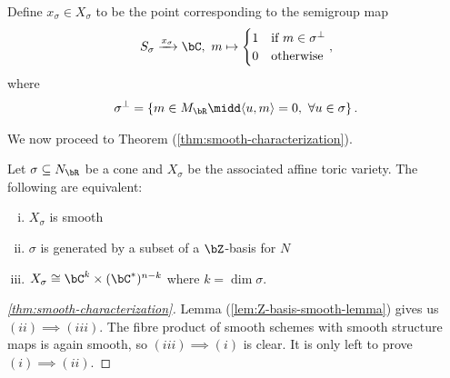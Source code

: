 \begin{defn}\label{defn:perp-cone-distinguished-semigroup-hom}
	Define $x_\sigma \in X_\sigma$ to be the point corresponding to the semigroup map
	\begin{align*}
		S_\sigma \xrightarrow{x_\sigma} \bC, ~ m \mapsto 
		\begin{cases}
			1 & \text{if } m \in \sigma^\perp \\
			0 & \text{otherwise} 
		\end{cases},
	\end{align*}
	where
	\begin{align*}
		\sigma^\perp = \left\{m\in M_\bR \midd \langle u,m\rangle = 0, ~\forall u \in \sigma\right\} .
	\end{align*}
\end{defn}
We now proceed to Theorem (\ref{thm:smooth-characterization}).
\begin{thm}\label{thm:smooth-characterization}
	Let  $\sigma \subseteq N_\bR$ be a cone and $X_\sigma$ be the associated affine toric variety. The following are equivalent:
	\begin{enumerate}[(i)]
		\item $X_\sigma$ is smooth
		\item $\sigma$ is generated by a subset of a $\bZ$-basis for $N$ 
		\item $X_\sigma \cong \bC^k \times (\bC^*)^{n-k}$ where $k = \dim \sigma$.
	\end{enumerate}
\end{thm}
\begin{proof}[\ref{thm:smooth-characterization}]
	Lemma (\ref{lem:Z-basis-smooth-lemma}) gives us $(ii)\implies (iii)$. The fibre product of smooth schemes with smooth structure maps is again smooth, so $(iii)\implies (i)$ is clear. It is only left to prove $(i) \implies (ii)$. 
\end{proof}

